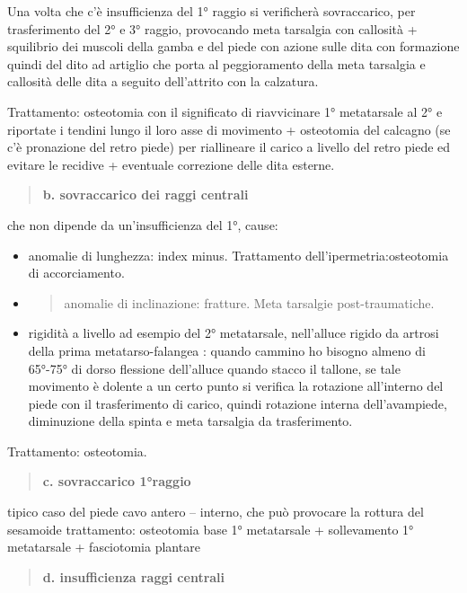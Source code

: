 \documentclass[]{article}
\begin{document}
Una volta che c'è insufficienza del 1° raggio si verificherà
sovraccarico, per trasferimento del 2° e 3° raggio, provocando meta
tarsalgia con callosità + squilibrio dei muscoli della gamba e del piede
con azione sulle dita con formazione quindi del dito ad artiglio che
porta al peggioramento della meta tarsalgia e callosità delle dita a
seguito dell'attrito con la calzatura.

Trattamento: osteotomia con il significato di riavvicinare 1°
metatarsale al 2° e riportate i tendini lungo il loro asse di movimento
+ osteotomia del calcagno (se c'è pronazione del retro piede) per
riallineare il carico a livello del retro piede ed evitare le recidive +
eventuale correzione delle dita esterne.

\begin{quote}
\textbf{b. sovraccarico dei raggi centrali}
\end{quote}

che non dipende da un'insufficienza del 1°, cause:

\begin{itemize}
\item
  anomalie di lunghezza: index minus. Trattamento
  dell'ipermetria:osteotomia di accorciamento.
\item
  \begin{quote}
  anomalie di inclinazione: fratture. Meta tarsalgie post-traumatiche.
  \end{quote}
\item
  rigidità a livello ad esempio del 2° metatarsale, nell'alluce rigido
  da artrosi della prima metatarso-falangea : quando cammino ho bisogno
  almeno di 65°-75° di dorso flessione dell'alluce quando stacco il
  tallone, se tale movimento è dolente a un certo punto si verifica la
  rotazione all'interno del piede con il trasferimento di carico, quindi
  rotazione interna dell'avampiede, diminuzione della spinta e meta
  tarsalgia da trasferimento.
\end{itemize}

Trattamento: osteotomia.

\begin{quote}
\textbf{c. sovraccarico 1°raggio}
\end{quote}

tipico caso del piede cavo antero -- interno, che può provocare la
rottura del sesamoide trattamento: osteotomia base 1° metatarsale +
sollevamento 1° metatarsale + fasciotomia plantare

\begin{quote}
\textbf{d. insufficienza raggi centrali}
\end{quote}
\end{document}
